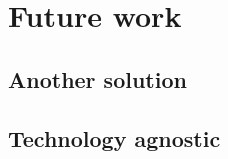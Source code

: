 \chapter{Future work}\label{chapter:future-work}

\section{Another solution}


\section{Technology agnostic}





